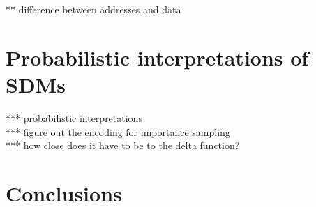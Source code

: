 \documentclass[10pt,letterpaper]{article}
\begin{document}
** difference between addresses and data \\



\section{Probabilistic interpretations of SDMs}

*** probabilistic interpretations \cite{Anderson1989}\\
*** figure out the encoding for importance sampling \\
*** how close does it have to be to the delta function? \\



\section{Conclusions}




\end{document}
